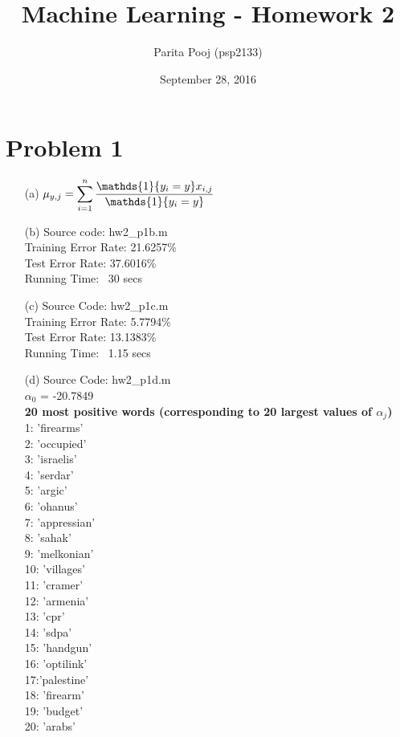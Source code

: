 \documentclass[fleqn]{article}
\title{Machine Learning - Homework 2}
\author{Parita Pooj (psp2133)}
\date{September 28, 2016}
\begin{document}
\maketitle
\setcounter{secnumdepth}{0}
\section{Problem 1}{}
\begin{itemize}
        \item[(a)]
                $\mu_{y, j} = \smashoperator{\sum_{i = 1}^{n}} \frac{\mathds{1}\{y_i = y\} x_{i, j}}{\mathds{1}\{y_i = y\}}$
        \item[(b)]
                Source code: hw2\_p1b.m\\
                Training Error Rate: 21.6257\%\\
                Test Error Rate: 37.6016\%\\
                Running Time: ~30 secs
        \item[(c)]
                Source Code: hw2\_p1c.m\\
                Training Error Rate: 5.7794\%\\
                Test Error Rate: 13.1383\%\\
                Running Time: ~1.15 secs
        \item[(d)]
                Source Code: hw2\_p1d.m\\
                $\alpha_0$ = -20.7849\\
                \textbf{20 most positive words (corresponding to 20 largest values of $\alpha_j$)}\\
                1: 'firearms'\\
                2: 'occupied'\\
                3: 'israelis'\\
                4: 'serdar'\\
                5: 'argic'\\
                6: 'ohanus'\\
                7: 'appressian'\\
                8: 'sahak'\\
                9: 'melkonian'\\
                10: 'villages'\\
                11: 'cramer'\\
                12: 'armenia'\\
                13: 'cpr'\\
                14: 'sdpa'\\
                15: 'handgun'\\
                16: 'optilink'\\
                17:'palestine'\\
                18: 'firearm'\\
                19: 'budget'\\
                20: 'arabs'\\


\end{itemize}
\end{document}
